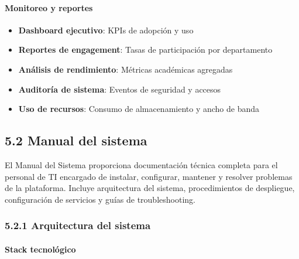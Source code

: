 \paragraph{Monitoreo y reportes}

\begin{itemize}
	\item \textbf{Dashboard ejecutivo}: KPIs de adopción y uso
	\item \textbf{Reportes de engagement}: Tasas de participación por departamento
	\item \textbf{Análisis de rendimiento}: Métricas académicas agregadas
	\item \textbf{Auditoría de sistema}: Eventos de seguridad y accesos
	\item \textbf{Uso de recursos}: Consumo de almacenamiento y ancho de banda
\end{itemize}

\subsection{5.2 Manual del sistema}

El Manual del Sistema proporciona documentación técnica completa para el personal de TI encargado de instalar, configurar, mantener y resolver problemas de la plataforma. Incluye arquitectura del sistema, procedimientos de despliegue, configuración de servicios y guías de troubleshooting.

\subsubsection{5.2.1 Arquitectura del sistema}

\paragraph{Stack tecnológico}

